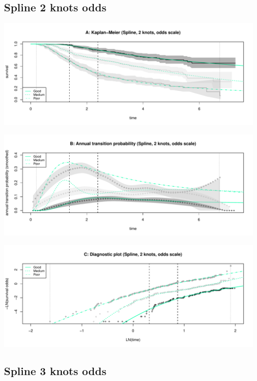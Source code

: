 \documentclass[]{article}
\begin{document}
\subsection{Spline 2 knots odds}\label{spline-2-knots-odds}

\begin{flushleft}\includegraphics[height=0.25\textheight]{Images/spline_odds2-1} \end{flushleft}

\begin{flushleft}\includegraphics[height=0.25\textheight]{Images/spline_odds2-2} \end{flushleft}

\begin{flushleft}\includegraphics[height=0.25\textheight]{Images/spline_odds2-3} \end{flushleft}

\newpage

\subsection{Spline 3 knots odds}\label{spline-3-knots-odds}
\end{document}
